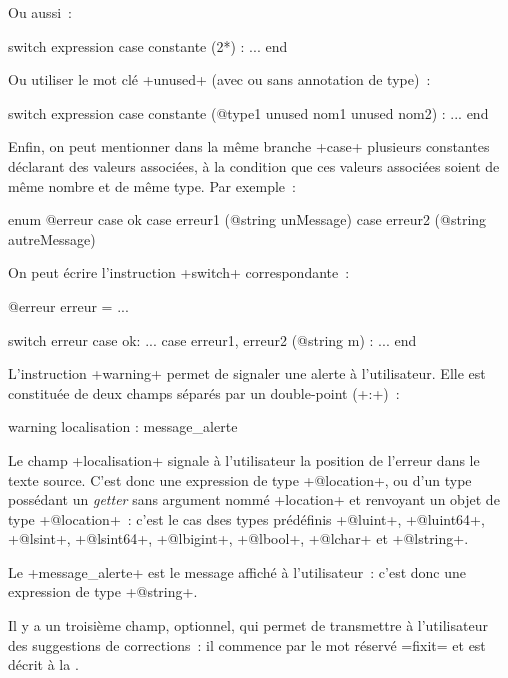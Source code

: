 Ou aussi~:
\begin{galgas3}
switch expression
case constante (2*) :
...
end
\end{galgas3}


Ou utiliser le mot clé \ggst+unused+ (avec ou sans annotation de type)~:
\begin{galgas3}
switch expression
case constante (@type1 unused nom1 unused nom2) :
...
end
\end{galgas3}


Enfin, on peut mentionner dans la même branche \ggst+case+ plusieurs constantes déclarant des valeurs associées, à la condition que ces valeurs associées soient de même nombre et de même type. Par exemple~:

\begin{galgas3}
enum @erreur {
  case ok
  case erreur1 (@string unMessage)
  case erreur2 (@string autreMessage)
}
\end{galgas3}

On peut écrire l'instruction \ggst+switch+ correspondante~:
\begin{galgas3}
@erreur erreur = ...

switch erreur
case ok:
  ...
case erreur1, erreur2 (@string m) :
  ...
end
\end{galgas3}





L'instruction \ggst+warning+ permet de signaler une alerte à l'utilisateur. Elle est constituée de deux champs séparés par un double-point (\ggst+:+)~:

\begin{galgas3}
warning localisation : message_alerte
\end{galgas3}



Le champ \ggst+localisation+ signale à l'utilisateur la position de l'erreur dans le texte source. C'est donc une expression de type \ggst+@location+, ou d'un type possédant un \emph{getter} sans argument nommé \ggst+location+ et renvoyant un objet de type \ggst+@location+~: c'est le cas dses types prédéfinis \ggst+@luint+, \ggst+@luint64+, \ggst+@lsint+, \ggst+@lsint64+, \ggst+@lbigint+, \ggst+@lbool+, \ggst+@lchar+ et \ggst+@lstring+.


Le \ggst+message_alerte+ est le message affiché à l'utilisateur~: c'est donc une expression de type \ggst+@string+.

Il y a un troisième champ, optionnel, qui permet de transmettre à l'utilisateur des suggestions de corrections~: il commence par le mot réservé \ggst=fixit= et est décrit à la .

